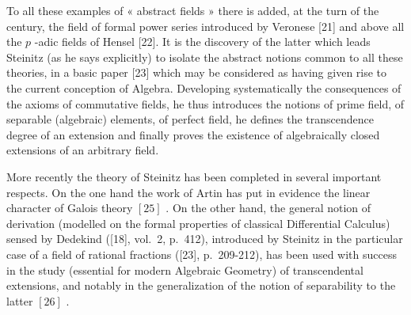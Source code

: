 To all these examples of « abstract fields » there is added, at the turn of the century, the field of formal power series introduced by Veronese {[}21{]} and above all the \(p\) -adic fields of Hensel {[}22{]}. It is the discovery of the latter which leads Steinitz (as he says explicitly) to isolate the abstract notions common to all these theories, in a basic paper {[}23{]} which may be considered as having given rise to the current conception of Algebra. Developing systematically the consequences of the axioms of commutative fields, he thus introduces the notions of prime field, of separable (algebraic) elements, of perfect field, he defines the transcendence degree of an extension and finally proves the existence of algebraically closed extensions of an arbitrary field.

More recently the theory of Steinitz has been completed in several important respects. On the one hand the work of Artin has put in evidence the linear character of Galois theory \([25]\) . On the other hand, the general notion of derivation (modelled on the formal properties of classical Differential Calculus) sensed by Dedekind ({[}18{]}, vol.~2, p.~412), introduced by Steinitz in the particular case of a field of rational fractions ({[}23{]}, p.~209-212), has been used with success in the study (essential for modern Algebraic Geometry) of transcendental extensions, and notably in the generalization of the notion of separability to the latter \([26]\) .

